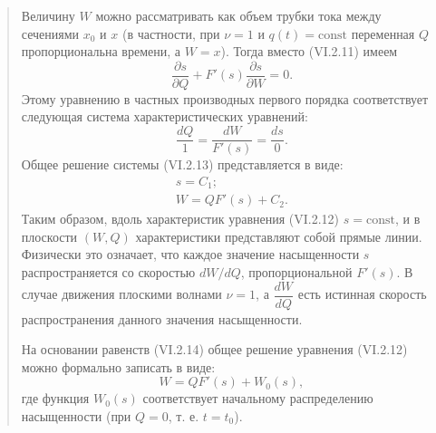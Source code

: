 \documentclass[12pt,a4paper]{article}
\begin{document}
\begin{quote}
Величину $W$ можно рассматривать как объем трубки тока между сечениями $x_0$ и $x$ (в частности, при $\nu=1$ и $q(t)=\mathrm{const}$ переменная $Q$ пропорциональна времени, а $W=x$). Тогда вместо (VI.2.11) имеем
\begin{equation}\frac{\partial s}{\partial Q}+F'(s)\frac{\partial s}{\partial W}=0.\tag{VI.2.12}\label{q11:eq-VI-2-12}\end{equation}
Этому уравнению в частных производных первого порядка соответствует следующая система характеристических уравнений:
\begin{equation}\frac{dQ}{1}=\frac{dW}{F'(s)}=\frac{ds}{0}.\tag{VI.2.13}\label{q11:eq-VI-2-13}\end{equation}
Общее решение системы (VI.2.13) представляется в виде:
\begin{equation}\begin{gathered}s=C_1;\\W=QF'(s)+C_2.\end{gathered}\tag{VI.2.14}\label{q11:eq-VI-2-14}\end{equation}
Таким образом, вдоль характеристик уравнения (VI.2.12) $s=\mathrm{const}$, и в плоскости $(W,Q)$ характеристики представляют собой прямые линии. Физически это означает, что каждое значение насыщенности $s$ распространяется со скоростью $dW/dQ$, пропорциональной $F'(s)$. В случае движения плоскими волнами $\nu=1$, а $\dfrac{dW}{dQ}$ есть истинная скорость распространения данного значения насыщенности.

На основании равенств (VI.2.14) общее решение уравнения (VI.2.12) можно формально записать в виде:
\begin{equation}W=QF'(s)+W_0(s),\tag{VI.2.15}\label{q11:eq-VI-2-15}\end{equation}
где функция $W_0(s)$ соответствует начальному распределению насыщенности (при $Q=0$, т. е. $t=t_0$).
\par\nobreak{}\par
\end{quote}
\end{document}
